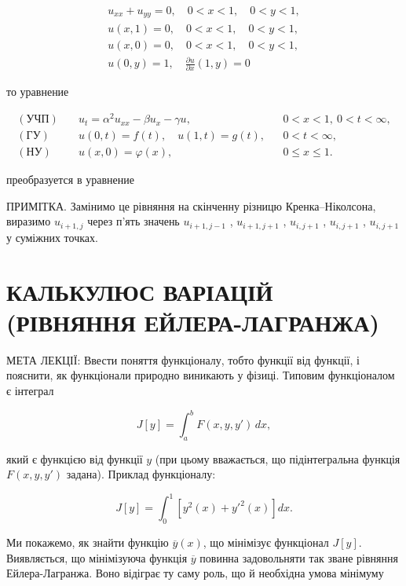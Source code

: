 \documentclass[
  ukrainian,
]{article}
\begin{document}
\[
\begin{array}{l} u_{xx} + u_{yy} = 0, \quad 0 < x < 1, \quad 0 < y < 1, \\ u(x, 1) = 0, \quad 0 < x < 1, \quad 0 < y < 1, \\ u(x, 0) = 0, \quad 0 < x < 1, \quad 0 < y < 1, \\ u(0, y) = 1, \quad \frac{\partial u}{\partial x}(1, y) = 0 \end{array}
\]

то уравнение

\[
\begin{aligned}
(\text{УЧП})\quad & u_t = \alpha^2 u_{xx} - \beta u_x - \gamma u, && 0 < x < 1,\ 0 < t < \infty, \\
(\text{ГУ})\quad & u(0,t) = f(t),\quad u(1,t) = g(t), && 0 < t < \infty, \\
(\text{НУ})\quad & u(x,0) = \varphi(x), && 0 \leqslant x \leqslant 1.
\end{aligned}
\]

преобразуется в уравнение

ПРИМІТКА. Замінимо це рівняння на скінченну різницю Кренка--Ніколсона,
виразимо \(u_{i+1,j}\) через п'ять значень \(u_{i+1,j-1}\) ,
\(u_{i+1,j+1}\) , \(u_{i,j+1}\) , \(u_{i,j+1}\) , \(u_{i,j+1}\) у
суміжних точках.

\section{КАЛЬКУЛЮС ВАРІАЦІЙ (РІВНЯННЯ
ЕЙЛЕРА-ЛАГРАНЖА)}\label{ux43aux430ux43bux44cux43aux443ux43bux44eux441-ux432ux430ux440ux456ux430ux446ux456ux439-ux440ux456ux432ux43dux44fux43dux43dux44f-ux435ux439ux43bux435ux440ux430-ux43bux430ux433ux440ux430ux43dux436ux430}

МЕТА ЛЕКЦІЇ: Ввести поняття функціоналу, тобто функції від функції, і
пояснити, як функціонали природно виникають у фізиці. Типовим
функціоналом є інтеграл

\[
J[y] = \int_a^b F(x, y, y')\,dx,
\]

який є функцією від функції \(y\) (при цьому вважається, що
підінтегральна функція \(F(x, y, y')\) задана). Приклад функціоналу:

\[
J[y] = \int_0^1 \left[y^2(x) + y'^2(x)\right] dx.
\]

Ми покажемо, як знайти функцію \(\overline{y}(x)\), що мінімізує
функціонал \(J[y]\). Виявляється, що мінімізуюча функція
\(\overline{y}\) повинна задовольняти так зване рівняння
Ейлера-Лагранжа. Воно відіграє ту саму роль, що й необхідна умова
мінімуму
\end{document}
